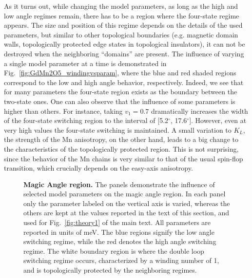 As it turns out, while changing the model parameters, as long as the high and low angle regimes remain, there has to be a region where the four-state regime appears. The size and position of this regime depends on the details of the used parameters, but similar to other topological boundaries (e.g. magnetic domain walls, topologically protected edge states in topological insulators), it can not be destroyed when the neighboring ``domains'' are present.
The influence of varying a single model parameter at a time is demonstrated in Fig.~\ref{fig:GdMn2O5_windingvsparam}, where the blue and red shaded regions correspond to the low and high angle behavior, respectively. Indeed, we see that for many parameters the four-state region exists as the boundary between the two-state ones.
One can also observe that the influence of some parameters is higher than others. For instance, taking $v_1=0.7$ dramatically increases the width of the four-state switching region to the interval of [5.2$^\circ$, 17.6$^\circ$]. However, even at very high values the four-state switching is maintained.
A small variation to $K_L$, the strength of the Mn anisotropy, on the other hand, leads to a big change to the characteristics of the topologically protected region.
This is not surprising, since the behavior of the Mn chains is very similar to that of the usual spin-flop transition, which crucially depends on the easy-axis anisotropy.
\begin{figure}[b!]
	\caption{\label{fig:GdMn2O5_windingvsmodelparam} {\bf Magic Angle region.} The panels demonstrate the influence of selected model parameters on the magic angle region. In each panel only the parameter labeled on the vertical axis is varied, whereas the others are kept at the values reported in the text of this section, and used for Fig.~\ref{fig:theory1} of the main text. All parameters are reported in units of meV. The blue regions signify the low angle switching regime, while the red denotes the high angle switching regime. The white boundary region is where the double loop switching regime occurs, characterized by a winding number of 1, and is topologically protected by the neighboring regimes.}
\end{figure}


